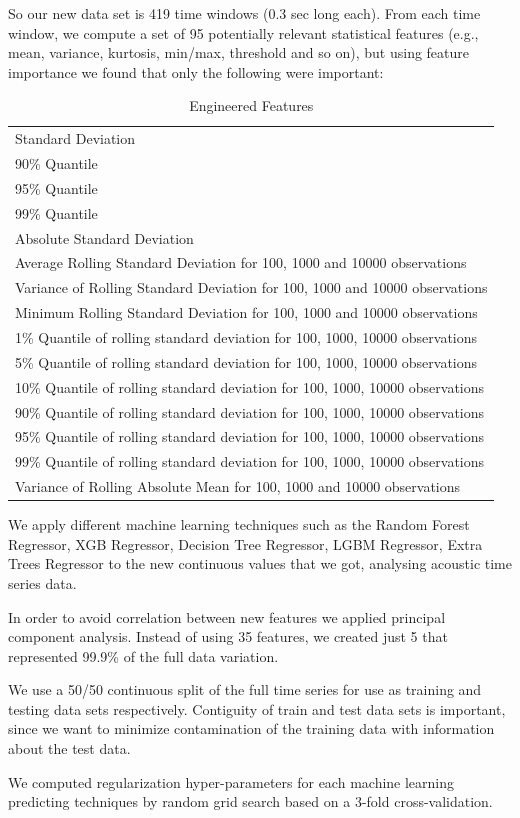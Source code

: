 \documentclass[]{llncs} %
\begin{document}
So our new data set is 419 time windows (0.3 sec long each).  From each time window, we compute a set of 95 potentially relevant statistical features (e.g., mean, variance, kurtosis, min/max, threshold and so on), but using feature importance we found that only the following were important:
\begin{table}[h!]
	\begin{center}
		\caption{Engineered Features}
		\label{tab:engineeredFeatrures}
		\begin{tabular}{l} 
Standard Deviation \\
90\% Quantile \\
95\% Quantile \\
99\% Quantile \\
Absolute Standard Deviation \\
Average Rolling Standard Deviation for 100, 1000 and 10000 observations \\
Variance of Rolling Standard Deviation for 100, 1000 and 10000 observations \\
Minimum Rolling Standard Deviation for 100, 1000 and 10000 observations \\
1\% Quantile of rolling standard deviation for 100, 1000, 10000 observations \\
5\% Quantile of rolling standard deviation for 100, 1000, 10000 observations \\
10\% Quantile of rolling standard deviation for 100, 1000, 10000 observations \\
90\% Quantile of rolling standard deviation for 100, 1000, 10000 observations \\
95\% Quantile of rolling standard deviation for 100, 1000, 10000 observations \\
99\% Quantile of rolling standard deviation for 100, 1000, 10000 observations \\
Variance of Rolling Absolute Mean for 100, 1000 and 10000 observations \\
		\end{tabular}
	\end{center}
\end{table}

We apply different machine learning techniques such as the Random Forest Regressor, XGB Regressor,  Decision Tree Regressor, LGBM Regressor, Extra Trees Regressor to the new continuous values that we got, analysing acoustic time series data. \par
In order to avoid correlation between new features we applied principal component analysis.  Instead of using 35 features, we created just 5 that represented 99.9\% of the full data variation. \par
We use a 50/50 continuous split of the full time series for use as training and testing data sets respectively. Contiguity of train and test data sets is important, since we want to minimize contamination of the training data with information about the test data. \par
We computed regularization hyper-parameters for each machine learning predicting techniques by random grid search based on a 3-fold cross-validation.
\end{document}
